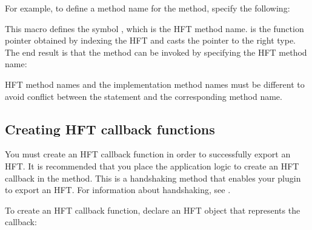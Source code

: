 \documentclass[letterpaper,12pt,english,openany,oneside]{sphinxmanual}
\begin{document}
For example, to define a method name for the  method, specify the following:

\begin{sphinxVerbatim}[commandchars=\\\{\}]
\end{sphinxVerbatim}

This macro defines the symbol , which is the HFT method name.  is the function pointer obtained by indexing the HFT and  casts the pointer to the right type. The end result is that the method can be invoked by specifying the HFT method name:

\begin{sphinxVerbatim}[commandchars=\\\{\}]
\end{sphinxVerbatim}

HFT method names and the implementation method names must be different to avoid conflict between the  statement and the corresponding method name.


\subsection{Creating HFT callback functions}
\label{\detokenize{Plugins_Hft:creating-hft-callback-functions}}
You must create an HFT callback function in order to successfully export an HFT. It is recommended that you place the application logic to create an HFT callback in the  method. This is a handshaking method that enables your plugin to export an HFT. For information about handshaking, see .

To create an HFT callback function, declare an HFT  object that represents the callback:

\begin{sphinxVerbatim}[commandchars=\\\{\}]
 
\end{sphinxVerbatim}
\end{document}
